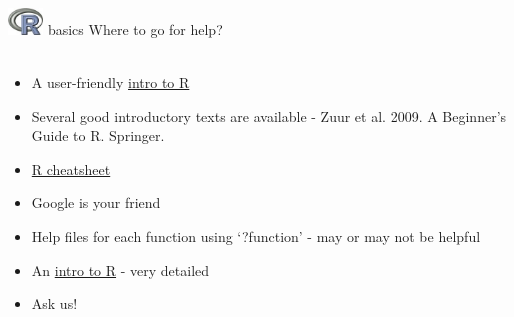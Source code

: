 \documentclass[xcolor=svgnames]{beamer}\usepackage[]{graphicx}\usepackage[]{color}
\begin{document}
\begin{frame}[t,fragile]{\includegraphics[width=0.07\textwidth]{Rlogo.jpg} \hspace{0.01in} basics}
Where to go for help?\\~\\
\begin{itemize}
\addtolength{\itemsep}{0.08in}
\item A user-friendly \href{http://www.statmethods.net/}{intro to R} 
\item Several good introductory texts are available - Zuur et al. 2009. A Beginner's Guide to R. Springer. 
\item \href{http://cran.r-project.org/doc/contrib/Short-refcard.pdf}{R cheatsheet}
\item Google is your friend
\item Help files for each function using `?function' - may or may not be helpful
\item An \href{http://cran.r-project.org/doc/manuals/R-intro.html}{intro to R} - very detailed
\item Ask us!
\end{itemize}
\end{frame}
\end{document}
